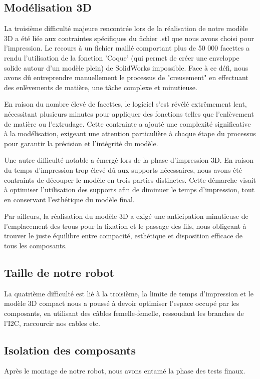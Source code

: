 \subsection{Modélisation 3D}
La troisième difficulté majeure rencontrée lors de la réalisation de notre modèle 3D a été liée aux contraintes spécifiques du fichier .stl que nous avons choisi pour l'impression. Le recours à un fichier maillé comportant plus de 50 000 facettes a rendu l'utilisation de la fonction 'Coque' (qui permet de créer une enveloppe solide autour d'un modèle plein) de SolidWorks impossible. Face à ce défi, nous avons dû entreprendre manuellement le processus de "creusement" en effectuant des enlèvements de matière, une tâche complexe et minutieuse.

En raison du nombre élevé de facettes, le logiciel s'est révélé extrêmement lent, nécessitant plusieurs minutes pour appliquer des fonctions telles que l'enlèvement de matière ou l'extrudage. Cette contrainte a ajouté une complexité significative à la modélisation, exigeant une attention particulière à chaque étape du processus pour garantir la précision et l'intégrité du modèle.

Une autre difficulté notable a émergé lors de la phase d'impression 3D. En raison du temps d'impression trop élevé dû aux supports nécessaires, nous avons été contraints de découper le modèle en trois parties distinctes. Cette démarche visait à optimiser l'utilisation des supports afin de diminuer le temps d'impression, tout en conservant l'esthétique du modèle final.

Par ailleurs, la réalisation du modèle 3D a exigé une anticipation minutieuse de l'emplacement des trous pour la fixation et le passage des fils, nous obligeant à trouver le juste équilibre entre compacité, esthétique et disposition efficace de tous les composants.

\subsection{Taille de notre robot}
La quatrième difficulté est lié à la troisième, la limite de temps d'impression et le modèle 3D compact nous a poussé à devoir optimiser l'espace occupé par les composants, en utilisant des câbles femelle-femelle, ressoudant les branches de l'I2C, raccourcir nos cables etc.

\subsection{Isolation des composants}
Après le montage de notre robot, nous avons entamé la phase des tests finaux.

